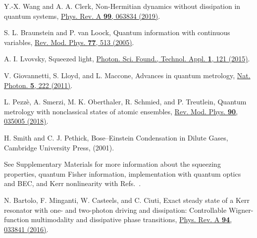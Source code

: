 \documentclass[twocolumn,prl,floatfix,citeautoscript,nofootinbib,superscriptaddress]{revtex4}
\begin{document}
\begin{thebibliography}{99}
 Y.-X. Wang and A. A. Clerk, Non-Hermitian
dynamics without dissipation in quantum systems, \href{https://doi.org/10.1103/PhysRevA.99.063834}%
{Phys. Rev. A \textbf{99}, 063834 (2019)}.



 S. L. Braunstein and P. van Loock, Quantum
information with continuous variables, \href{https://doi.org/10.1103/RevModPhys.77.513}%
{Rev. Mod. Phys. \textbf{77}, 513 (2005)}.

 A. I. Lvovsky, Squeezed light, \href{https://doi.org/10.1002/9781119009719.ch5}%
{Photon. Sci. Found., Technol. Appl. \textbf{1}, 121 (2015)}.


 V. Giovannetti, S. Lloyd, and L. Maccone, Advances
in quantum metrology, \href{https://doi.org/10.1038/nphoton.2011.35}{Nat.
Photon. \textbf{5}, 222 (2011)}.

 L. Pezz\`e, A. Smerzi, M. K. Oberthaler, R.
Schmied, and P. Treutlein, Quantum metrology with nonclassical states of
atomic ensembles, \href{https://doi.org/10.1103/RevModPhys.90.035005}{Rev.
Mod. Phys. \textbf{90}, 035005 (2018)}.

 H. Smith and C. J. Pethick, Bose–Einstein Condensation in Dilute Gases,
Cambridge University Press, (2001).





 See Supplementary Materials for more information about the
squeezing properties, quantum Fisher information, implementation with
quantum optics and BEC, and Kerr nonlinearity with Refs.~\cite{PhysRevA.94.033841,ncomms11417,PhysRevA.98.042118,PhysRevLett.123.173601,PhysRevLett.125.240405,PhysRevA.103.033711,arXiv:2107.04503,PhysRevLett.81.3811,PhysRep.529.265}.


 N. Bartolo, F. Minganti, W. Casteels, and C. Ciuti, Exact steady state of a Kerr resonator with one- and two-photon driving and dissipation: Controllable Wigner-function multimodality and dissipative phase transitions, \href{https://doi.org/10.1103/PhysRevA.94.033841}%
{Phys. Rev. A \textbf{94}, 033841 (2016)}.


\end{thebibliography}
\end{document}
